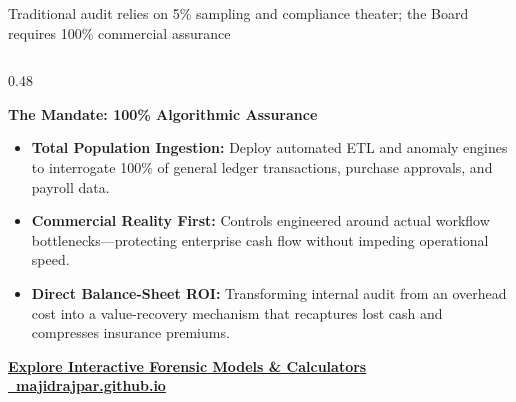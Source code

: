 \documentclass[aspectratio=169, 8pt]{beamer}
\begin{document}
\begin{frame}{Traditional audit relies on 5\% sampling and compliance theater; the Board requires 100\% commercial assurance}
\begin{columns}[T]
        \begin{column}{0.48\textwidth}
            \begin{tcolorbox}[colback=terracotta!10, colframe=terracotta!40, arc=1pt, boxrule=0.6pt, left=4pt, right=4pt, top=3pt, bottom=3pt]
                \textbf{\normalsize \color{terracotta} The Mandate: 100\% Algorithmic Assurance}
            \end{tcolorbox}
            \vspace{0.1cm}
            \begin{itemize}
                \setlength{\itemsep}{3.5pt}
                \item \textbf{Total Population Ingestion:} Deploy automated ETL and anomaly engines to interrogate 100\% of general ledger transactions, purchase approvals, and payroll data.
                \item \textbf{Commercial Reality First:} Controls engineered around actual workflow bottlenecks—protecting enterprise cash flow without impeding operational speed.
                \item \textbf{Direct Balance-Sheet ROI:} Transforming internal audit from an overhead cost into a value-recovery mechanism that recaptures lost cash and compresses insurance premiums.
            \end{itemize}
            
            \vspace{0.12cm}
            \begin{tcolorbox}[colback=obsidian, colframe=warmGold, arc=1pt, boxrule=0.5pt, left=3pt, right=3pt, top=2pt, bottom=2pt]
                \centering
                \href{https://majidrajpar.github.io/portfolio_my/tools}{\color{pureWhite}\textbf{Explore Interactive Forensic Models \& Calculators \textbar\ \color{warmGold}majidrajpar.github.io}}
            \end{tcolorbox}
        \end{column}
    \end{columns}
\end{frame}
\end{document}
